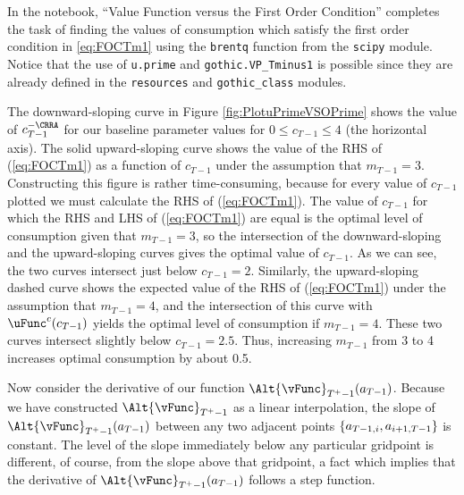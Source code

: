 \documentclass[titlepage, headings=optiontotocandhead]{\econtex}
\begin{document}
In the notebook, ``Value Function versus the First Order Condition'' completes the task of finding the values
of consumption which satisfy the first order condition in \eqref{eq:FOCTm1} using
the \texttt{brentq} function from the \texttt{scipy} module. Notice that the use of  \texttt{u.prime} and \texttt{gothic.VP\_Tminus1}
is possible since they are already defined in the
\texttt{resources} and \texttt{gothic\_class} modules.

The downward-sloping curve in Figure \ref{fig:PlotuPrimeVSOPrime}
shows the value of ${c}_{T-1}^{-\CRRA}$ for our baseline parameter values
for $0 \leq {c}_{T-1} \leq 4$ (the horizontal axis).  The solid
upward-sloping curve shows the value of the RHS of (\ref{eq:FOCTm1})
as a function of ${c}_{T-1}$ under the assumption that ${m}_{T-1}=3$.
Constructing this figure is rather time-consuming, because for every
value of ${c}_{T-1}$ plotted we must calculate the RHS of
(\ref{eq:FOCTm1}).  The value of ${c}_{T-1}$ for which the RHS and LHS
of (\ref{eq:FOCTm1}) are equal is the optimal level of consumption
given that ${m}_{T-1}=3$, so the intersection of the downward-sloping
and the upward-sloping curves gives the optimal value of ${c}_{T-1}$.
As we can see, the two curves intersect just below ${c}_{T-1}=2$.
Similarly, the upward-sloping dashed curve shows the expected value
of the RHS of (\ref{eq:FOCTm1}) under the assumption that ${m}_{T-1}=4$,
and the intersection of this curve with $\uFunc^{{c}}({c}_{T-1})$ yields the
optimal level of consumption if ${m}_{T-1}=4$.  These two curves
intersect slightly below ${c}_{T-1}=2.5$.  Thus, increasing ${m}_{T-1}$
from 3 to 4 increases optimal consumption by about 0.5.

 Now consider the derivative of our function
$\Alt{\vFunc}_{T^{+}-1}({a}_{T-1})$.  Because we have constructed
$\Alt{\vFunc}_{T^{+}-1}$ as a linear interpolation, the slope of
$\Alt{\vFunc}_{T^{+}-1}({a}_{T-1})$ between any two adjacent
points $\{\null{a}_{T-1,i},{a}_{i+1,T-1}\}$ is constant.  The
level of the slope immediately below any particular gridpoint is
different, of course, from the slope above that gridpoint, a fact
which implies that the derivative of
$\Alt{\vFunc}_{T^{+}-1}({a}_{T-1})$ follows a step function.
\end{document}
